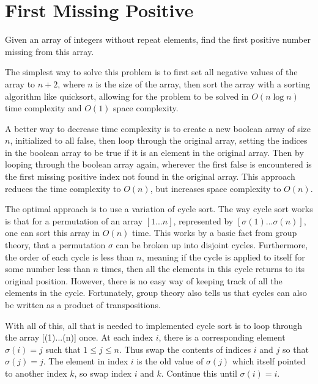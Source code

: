 \documentclass{article}
\begin{document}
\section*{First Missing Positive}

Given an array of integers without repeat elements, find the first positive number missing from this array.

The simplest way to solve this problem is to first set all negative values of the array to \( n + 2 \), where \( n \) is the size of the array, then sort the array with a sorting algorithm like quicksort, allowing for the problem to be solved in \( O(n \log{n}) \) time complexity and \( O(1) \) space complexity. 

A better way to decrease time complexity is to create a new boolean array of size \( n \), initialized to all false, then loop through the original array, setting the indices in the boolean array to be true if it is an element in the original array. Then by looping through the boolean array again, wherever the first false is encountered is the first missing positive index not found in the original array. This approach reduces the time complexity to \( O(n) \), but increases space complexity to \( O(n) \).

The optimal approach is to use a variation of cycle sort. The way cycle sort works is that for a permutation of an array \( [1...n] \), represented by \( [\sigma(1)...\sigma(n)] \), one can sort this array in \( O(n) \) time. This works by a basic fact from group theory, that a permutation \( \sigma \) can be broken up into disjoint cycles. Furthermore, the order of each cycle is less than \( n \), meaning if the cycle is applied to itself for some number less than \( n \) times, then all the elements in this cycle returns to its original position. However, there is no easy way of keeping track of all the elements in the cycle. Fortunately, group theory also tells us that cycles can also be written as a product of transpositions.

With all of this, all that is needed to implemented cycle sort is to loop through the array [\sigma(1)...\sigma(n)] \) once. At each index \( i \), there is a corresponding element \( \sigma(i) = j \) such that \( 1 \leq j \leq n \). Thus swap the contents of indices \( i \) and \( j \) so that \( \sigma(j) = j \). The element in index \( i \) is the old value of \( \sigma(j) \) which itself pointed to another index \( k \), so swap index \( i \) and \( k \). Continue this until \( \sigma(i) = i \). 
\end{document}
